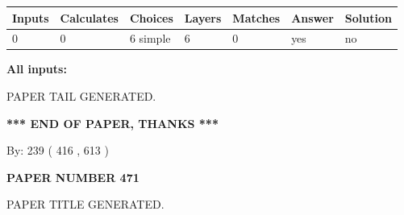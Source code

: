 \documentclass{ctexart}
\begin{document}
 
   
   
   
   
\noindent\begin{tabular}{|l|l|l|l|l|l|l|}
 \hline
Inputs & Calculates & Choices & Layers & Matches & Answer & Solution \\ \hline
 0  & 
 0  & 
 6
  simple  
  & 
 6  & 
 0  & 
  yes & 
  no 
  \\ \hline
 \end{tabular}
   
   
   
   
\noindent{}
   
   
   
   
\noindent\vspace{0.1in}\hspace{-0.08in} {\textbf{\Large{All inputs: }}}
   
   
   
   
   
   
 \vspace{0.2in}
 
   
   
\vspace{2.0in} PAPER TAIL GENERATED.
   
   
   
   
\vspace{1.0in} 
{\textbf{\large{ *** END OF PAPER, THANKS *** }}} 
   
   
\hspace{1.0in} By: 
 239 ( 416 ,  613 )
   
   
   
   
\newpage 
\setcounter{page}{ 
   471001 } 
   
   
   
   
 {\textbf{ \Large{ PAPER NUMBER  471  }}}
   
   
\vspace{0.2in}
   
   
   
   
   
   
   
   
 \vspace{0.2in}
 
 
 
 
   
   
 PAPER TITLE GENERATED.
   
\end{document}
